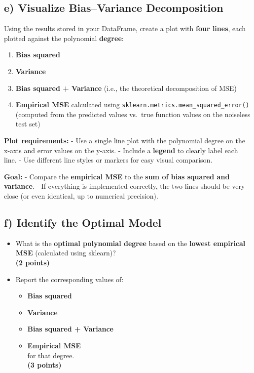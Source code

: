 \documentclass[
  letterpaper,
  DIV=11,
  numbers=noendperiod]{scrreprt}
\providecommand{\tightlist}{%
  \setlength{\itemsep}{0pt}\setlength{\parskip}{0pt}}\usepackage{longtable,booktabs,array}
\begin{document}
\subsection{e) Visualize Bias--Variance
Decomposition}\label{e-visualize-biasvariance-decomposition}

Using the results stored in your DataFrame, create a plot with
\textbf{four lines}, each plotted against the polynomial
\textbf{degree}:

\begin{enumerate}
\def\labelenumi{\arabic{enumi}.}
\tightlist
\item
  \textbf{Bias squared}
\item
  \textbf{Variance}
\item
  \textbf{Bias squared + Variance} (i.e., the theoretical decomposition
  of MSE)
\item
  \textbf{Empirical MSE} calculated using
  \texttt{sklearn.metrics.mean\_squared\_error()}\\
  (computed from the predicted values vs.~true function values on the
  noiseless test set)
\end{enumerate}

\textbf{Plot requirements:} - Use a single line plot with the polynomial
degree on the x-axis and error values on the y-axis. - Include a
\textbf{legend} to clearly label each line. - Use different line styles
or markers for easy visual comparison.

\textbf{Goal:} - Compare the \textbf{empirical MSE} to the \textbf{sum
of bias squared and variance}. - If everything is implemented correctly,
the two lines should be very close (or even identical, up to numerical
precision).

\subsection{f) Identify the Optimal
Model}\label{f-identify-the-optimal-model}

\begin{itemize}
\item
  What is the \textbf{optimal polynomial degree} based on the
  \textbf{lowest empirical MSE} (calculated using sklearn)?\\
  \textbf{(2 points)}
\item
  Report the corresponding values of:

  \begin{itemize}
  \tightlist
  \item
    \textbf{Bias squared}\\
  \item
    \textbf{Variance}\\
  \item
    \textbf{Bias squared + Variance}\\
  \item
    \textbf{Empirical MSE}\\
    for that degree.\\
    \textbf{(3 points)}
  \end{itemize}
\end{itemize}
\end{document}
